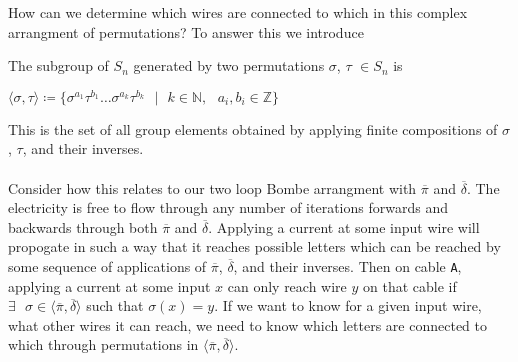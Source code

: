 \begin{figure}[H]
\begin{center}
{
		}
	\end{center}
\end{figure}
\noindent How can we determine which wires are connected to which in this complex arrangment of permutations? To answer this we introduce
\begin{definition}
	The subgroup of $S_n$ generated by two permutations $\sigma$, $\tau$ $\in S_n$ is
	\begin{center}
		$\langle\sigma,\tau\rangle \coloneq \{\sigma^{a_1}\tau^{b_1}\dots\sigma^{a_k}\tau^{b_k}\text{ }|\text{ }k\in\mathbb{N},\text{ }a_i,b_i\in\mathbb{Z}\}$
	\end{center}
\end{definition}
\noindent This is the set of all group elements obtained by applying finite compositions of $\sigma$, $\tau$, and their inverses.
\\\\Consider how this relates to our two loop Bombe arrangment with $\overline\pi$ and $\overline\delta$. The electricity is free to flow through any number of iterations forwards and backwards through both $\overline\pi$ and $\overline\delta$. Applying a current at some input wire will propogate in such a way that it reaches possible letters which can be reached by some sequence of applications of $\overline\pi$, $\overline\delta$, and their inverses. Then on cable \texttt{A}, applying a current at some input $x$ can only reach wire $y$ on that cable if $\exists\text{ }\sigma\in\langle\overline\pi, \overline\delta\rangle$ such that $\sigma(x) = y$. If we want to know for a given input wire, what other wires it can reach, we need to know which letters are connected to which through permutations in $\langle\overline\pi, \overline\delta\rangle$.
